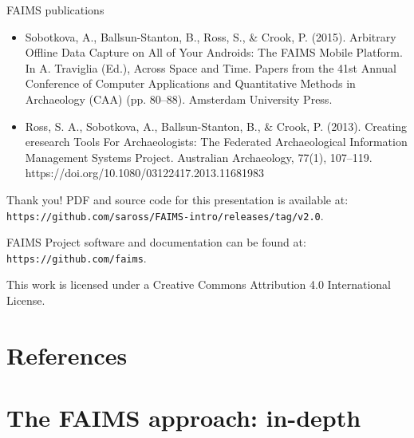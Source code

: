 \documentclass[aspectratio=169, 12pt]{beamer} %
\begin{document}
\begin{frame}[allowframebreaks]{FAIMS publications}
\begin{itemize}[label=\textbullet]
            \item Sobotkova, A., Ballsun-Stanton, B., Ross, S., \& Crook, P. (2015). Arbitrary Offline Data Capture on All of Your Androids: The FAIMS Mobile Platform. In A. Traviglia (Ed.), Across Space and Time. Papers from the 41st Annual Conference of Computer Applications and Quantitative Methods in Archaeology (CAA) (pp. 80–88). Amsterdam University Press.
            \item Ross, S. A., Sobotkova, A., Ballsun-Stanton, B., \& Crook, P. (2013). Creating eresearch Tools For Archaeologists: The Federated Archaeological Information Management Systems Project. Australian Archaeology, 77(1), 107–119. https://doi.org/10.1080/03122417.2013.11681983
        \end{itemize}
\end{frame}


\begin{frame}{Thank you!}
PDF and source code for this presentation is available at: 
\texttt{https://github.com/saross/FAIMS-intro/releases/tag/v2.0}.

FAIMS Project software and documentation can be found at:
\texttt{https://github.com/faims}.

This work is licensed under a Creative Commons Attribution 4.0 International License.

\end{frame}


\section{References}


  
%   
%   

\begin{multicols}{2}[]



\end{multicols}


\section{The FAIMS approach: in-depth}
\end{document}
